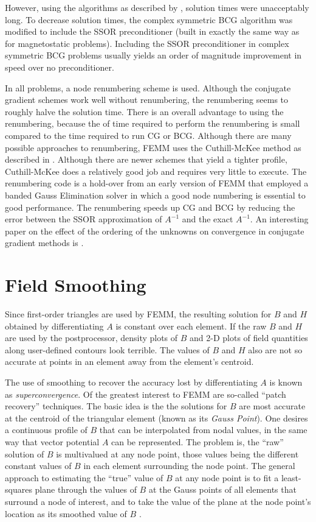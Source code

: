 \documentclass[12pt]{report}
\begin{document}
However, using the algorithms as described by \cite{freund},
solution times were unacceptably long.  To decrease solution times,
the complex symmetric BCG algorithm was modified to include the
SSOR preconditioner (built in exactly the same way as for
magnetostatic problems).  Including the SSOR preconditioner in
complex symmetric BCG problems usually yields an order of magnitude
improvement in speed over no preconditioner.

In all problems, a node renumbering scheme is used.  Although the
conjugate gradient schemes work well without renumbering, the
renumbering seems to roughly halve the solution time.  There is an
overall advantage to using the renumbering, because the of time
required to perform the renumbering is small compared to the time
required to run CG or BCG.  Although there are many possible
approaches to renumbering, FEMM uses the Cuthill-McKee method as
described in \cite{Hoole}. Although there are newer schemes that
yield a tighter profile, Cuthill-McKee does a relatively good job
and requires very little to execute. The renumbering code is a
hold-over from an early version of FEMM that employed a banded
Gauss Elimination solver in which a good node numbering is
essential to good performance.  The renumbering speeds up CG and
BCG by reducing the error between the SSOR approximation of
$A^{-1}$ and the exact $A^{-1}$.  An interesting paper on the
effect of the ordering of the unknowns on convergence in conjugate
gradient methods is \cite{Daze}.

\section{Field Smoothing}

Since first-order triangles are used by FEMM, the resulting
solution for $B$ and $H$ obtained by differentiating $A$ is
constant over each element. If the raw $B$ and $H$ are used by the
postprocessor, density plots of $B$ and 2-D plots of field
quantities along user-defined contours look terrible. The values of
$B$ and $H$ also are not so accurate at points in an element away
from the element's centroid.

The use of smoothing to recover the accuracy lost by
differentiating $A$ is known as {\em superconvergence}. Of the
greatest interest to FEMM are so-called ``patch recovery''
techniques. The basic idea is the the solutions for $B$ are most
accurate at the centroid of the triangular element (known as its
{\em Gauss Point}). One desires a continuous profile of $B$ that
can be interpolated from nodal values, in the same way that vector
potential $A$ can be represented. The problem is, the ``raw''
solution of $B$ is multivalued at any node point, those values
being the different constant values of $B$ in each element
surrounding the node point. The general approach to estimating the
``true'' value of $B$ at any node point is to fit a least-squares
plane through the values of $B$ at the Gauss points of all elements
that surround a node of interest, and to take the value of the
plane at the node point's location as its smoothed value of $B$
\cite{zen}.
\end{document}
